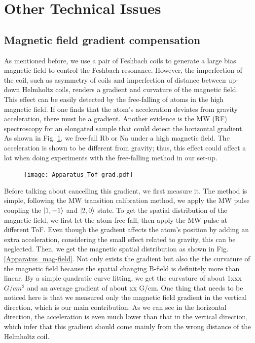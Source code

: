 \section{Other Technical Issues}
\subsection{Magnetic field gradient compensation}
\label{subsec:gradientcompen}
As mentioned before, we use a pair of Feshbach coils to generate a large bias magnetic field to control the Feshbach resonance. However,  the imperfection of the coil, such as asymmetry of coils and imperfection of distance between up-down Helmholtz coils, renders a gradient and curvature of the magnetic field. This effect can be easily detected by the free-falling of atoms in the high magnetic field. If one finds that the atom's acceleration deviates from gravity acceleration, there must be a gradient. Another evidence is the MW (RF) spectroscopy for an elongated sample that could detect the horizontal gradient. As shown in Fig. \ref{Apparatus_Tof-grad}, we free-fall Rb or Na under a high magnetic field. The acceleration is shown to be different from gravity; thus, this effect could affect a lot when doing experiments with the free-falling method in our set-up.

\begin{figure}[htbp]
\begin{center}
\texttt{[image: Apparatus\_Tof-grad.pdf]}
\end{center}
\caption[]{}
\label{Apparatus_Tof-grad}
\end{figure}

Before talking about cancelling this gradient, we first measure it. The method is simple, following the MW transition calibration method, we apply the MW pulse coupling the $\ket{1,-1}$ and $\ket{2,0}$ state. To get the spatial distribution of the magnetic field, we first let the atom free-fall, then apply the MW pulse at different ToF. Even though the gradient affects the atom's position by adding an extra acceleration, considering the small effect related to gravity, this can be neglected. Then, we get the magnetic spatial distribution as shown in Fig.\ref{Apparatus_mag-field}. Not only exists the gradient but also the the curvature of the magnetic field because the spatial changing B-field is definitely more than linear. By a simple quadratic curve fitting, we get the curvature of about 1xxx \(G/cm^2\) and an average gradient of about xx G/cm. One thing that needs to be noticed here is that we measured only the magnetic field gradient in the vertical direction, which is our main contribution. As we can see in the horizontal direction, the acceleration is even much lower than that in the vertical direction, which infer that this gradient should come mainly from the wrong distance of the Helmholtz coil.

